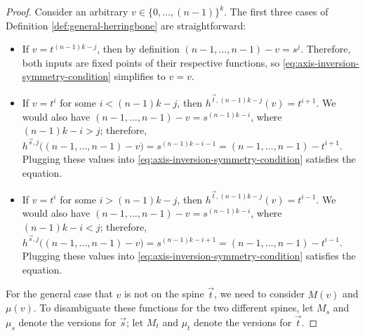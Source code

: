 \documentclass[11pt]{article}
\begin{document}
\begin{proof}
    Consider an arbitrary $v \in \{0, \ldots, (n-1)\}^k$. The first three cases of Definition \ref{def:general-herringbone} are straightforward:
    \begin{itemize}
        \item If $v = t^{(n-1)k-j}$, then by definition $(n-1, \ldots, n-1) - v = s^j$. Therefore, both inputs are fixed points of their respective functions, so \eqref{eq:axis-inversion-symmetry-condition} simplifies to $v=v$.
        \item If $v = t^i$ for some $i < (n-1)k-j$, then $h^{\vec{t}, (n-1)k-j}(v) = t^{i+1}$. We would also have $(n-1, \ldots, n-1) - v = s^{(n-1)k-i}$, where $(n-1)k-i > j$; therefore, $h^{\vec{s}, j}\bigl( (n-1, \ldots, n-1) - v \bigr) = s^{(n-1)k - i - 1} = (n-1, \ldots, n-1) - t^{i+1}$. Plugging these values into \eqref{eq:axis-inversion-symmetry-condition} satisfies the equation.
        \item If $v = t^i$ for some $i > (n-1)k-j$, then $h^{\vec{t}, (n-1)k-j}(v) = t^{i-1}$. We would also have $(n-1, \ldots, n-1) - v = s^{(n-1)k-i}$, where $(n-1)k-i < j$; therefore, $h^{\vec{s}, j}\bigl( (n-1, \ldots, n-1) - v \bigr) = s^{(n-1)k - i + 1} = (n-1, \ldots, n-1) - t^{i-1}$. Plugging these values into \eqref{eq:axis-inversion-symmetry-condition} satisfies the equation.
    \end{itemize}
    For the general case that $v$ is not on the spine $\vec{t}$, we need to consider $M(v)$ and $\mu(v)$. To disambiguate these functions for the two different spines, let $M_s$ and $\mu_s$ denote the versions for $\vec{s}$; let $M_t$ and $\mu_t$ denote the versions for $\vec{t}$.


\end{proof}
\end{document}
